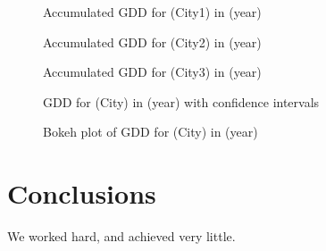 \documentclass[12pt]{article}
\begin{document}
\begin{figure}[!htbp]
\centering
\caption{\scriptsize Accumulated GDD for (City1) in (year)}
\label{Label}		  
\end{figure}

\begin{figure}[!htbp]
\centering
\caption{\scriptsize Accumulated GDD for (City2) in (year)}
\label{Label}		  
\end{figure}
	
\begin{figure}[!htbp]
\centering
\caption{\scriptsize Accumulated GDD for (City3) in (year)}
\label{Label}		  
\end{figure}	

\begin{figure}[!htbp]
\centering
\caption{\scriptsize GDD for (City) in (year) with confidence intervals}
\label{Label}		  
\end{figure}

\begin{figure}[!htbp]
\centering
\caption{\scriptsize Bokeh plot of GDD for (City) in (year)}
\label{Label}		  
\end{figure}

\pagebreak

\section{Conclusions}\label{conclusions}
We worked hard, and achieved very little.



\end{document}
